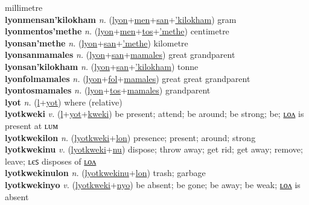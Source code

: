 millimetre \label{lyonmensan'methe} \\
\textbf{lyonmensan'kilokham} \textit{n.} (\hyperref[lyon]{lyon}+\hyperref[men]{men}+\hyperref[san]{san}+\hyperref['kilokham]{'kilokham})
gram \label{lyonmensan'kilokham} \\
\textbf{lyonmentos'methe} \textit{n.} (\hyperref[lyon]{lyon}+\hyperref[men]{men}+\hyperref[tos]{tos}+\hyperref['methe]{'methe})
centimetre \label{lyonmentos'methe} \\
\textbf{lyonsan'methe} \textit{n.} (\hyperref[lyon]{lyon}+\hyperref[san]{san}+\hyperref['methe]{'methe})
kilometre \label{lyonsan'methe} \\
\textbf{lyonsanmamales} \textit{n.} (\hyperref[lyon]{lyon}+\hyperref[san]{san}+\hyperref[mamales]{mamales})
great grandparent \label{lyonsanmamales} \\
\textbf{lyonsan'kilokham} \textit{n.} (\hyperref[lyon]{lyon}+\hyperref[san]{san}+\hyperref['kilokham]{'kilokham})
tonne \label{lyonsan'kilokham} \\
\textbf{lyonfolmamales} \textit{n.} (\hyperref[lyon]{lyon}+\hyperref[fol]{fol}+\hyperref[mamales]{mamales})
great great grandparent \label{lyonfolmamales} \\
\textbf{lyontosmamales} \textit{n.} (\hyperref[lyon]{lyon}+\hyperref[tos]{tos}+\hyperref[mamales]{mamales})
grandparent \label{lyontosmamales} \\
\textbf{lyot} \textit{n.} (\hyperref[l]{l}+\hyperref[ot]{yot})
where (relative) \label{lyot} \\
\textbf{lyotkweki} \textit{v.} (\hyperref[l]{l}+\hyperref[yot]{yot}+\hyperref[kweki]{kweki})
be present; attend; be around; be strong; be; \hyperref[lyotkwekilon]{ʟᴏᴧ} is present at ʟᴜᴍ \label{lyotkweki} \\
\textbf{lyotkwekilon} \textit{n.} (\hyperref[lyotkweki]{lyotkweki}+\hyperref[lon]{lon})
presence; present; around; strong \label{lyotkwekilon} \\
\textbf{lyotkwekinu} \textit{v.} (\hyperref[lyotkweki]{lyotkweki}+\hyperref[nu]{nu})
dispose; throw away; get rid; get away; remove; leave; ʟєꜱ disposes of \hyperref[lyotkwekinulon]{ʟᴏᴧ} \label{lyotkwekinu} \\
\textbf{lyotkwekinulon} \textit{n.} (\hyperref[lyotkwekinu]{lyotkwekinu}+\hyperref[lon]{lon})
trash; garbage \label{lyotkwekinulon} \\
\textbf{lyotkwekinyo} \textit{v.} (\hyperref[lyotkweki]{lyotkweki}+\hyperref[nyo]{nyo})
be absent; be gone; be away; be weak; \hyperref[lyotkwekinyolon]{ʟᴏᴧ} is absent \label{lyotkwekinyo} \\
